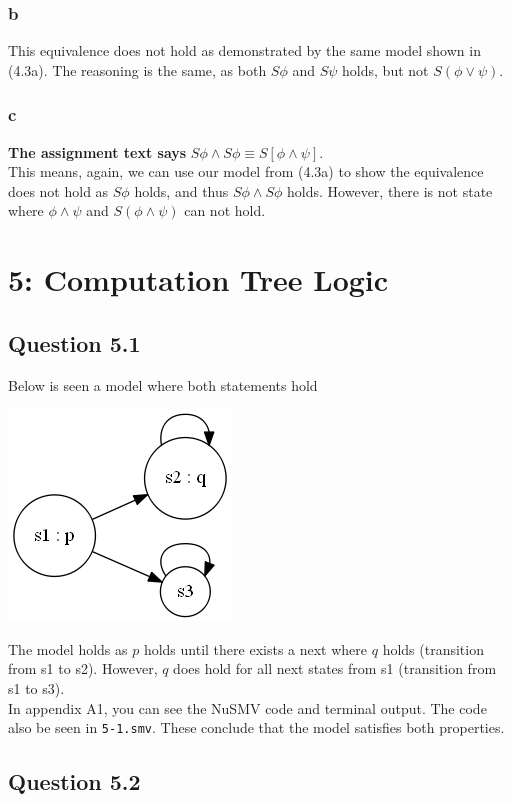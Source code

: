 \documentclass[12pt]{article}
\begin{document}
\subsubsection*{b}
This equivalence does not hold as demonstrated by the same model shown in (4.3a). The reasoning is the same, as both $S\phi$ and $S\psi$ holds, but not $S(\phi\lor\psi)$.

\subsubsection*{c}
\textbf{The assignment text says} $S\phi\land S\phi\equiv S[\phi\land\psi]$.\\
This means, again, we can use our model from (4.3a) to show the equivalence does not hold as $S\phi$ holds, and thus $S\phi\land S\phi$ holds. However, there is not state where $\phi\land\psi$ and $S(\phi\land\psi)$ can not hold.

\newpage
\section*{5: Computation Tree Logic}
\subsection*{Question 5.1}
Below is seen a model where both statements hold
\begin{center}
\includegraphics[scale=0.6]{4}
\end{center}
The model holds as $p$ holds until there exists a next where $q$ holds (transition from s1 to s2). However, $q$ does hold for all next states from s1 (transition from s1 to s3).\\
In appendix A1, you can see the NuSMV code and terminal output. The code also be seen in \texttt{5-1.smv}. These conclude that the model satisfies both properties.

\subsection*{Question 5.2}
\end{document}
